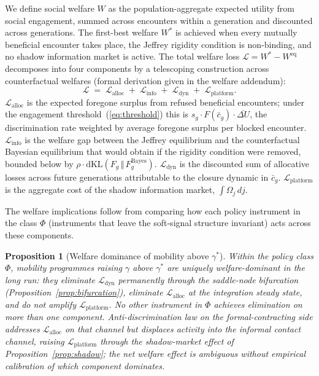 \documentclass[12pt,a4paper]{article}
\newtheorem{proposition}{Proposition}
\theoremstyle{definition}
\numberwithin{proposition}{subsection}
\begin{document}
We define social welfare $W$ as the population-aggregate expected
utility from social engagement, summed across encounters within a
generation and discounted across generations. The first-best welfare
$W^*$ is achieved when every mutually beneficial encounter takes
place, the Jeffrey rigidity condition is non-binding, and no shadow
information market is active. The total welfare loss
$\mathcal{L} = W^* - W^{\mathrm{eq}}$ decomposes into four
components by a telescoping construction across counterfactual
welfares (formal derivation given in the welfare addendum):
\begin{equation}
  \mathcal{L} \;=\;
  \mathcal{L}_{\text{alloc}} \;+\; \mathcal{L}_{\text{info}}
  \;+\; \mathcal{L}_{\text{dyn}} \;+\; \mathcal{L}_{\text{platform}}.
  \label{eq:welfare}
\end{equation}
$\mathcal{L}_{\text{alloc}}$ is the expected foregone surplus from
refused beneficial encounters; under the engagement
threshold~(\ref{eq:threshold}) this is $s_g \cdot F(\bar{c}_g)
\cdot \overline{\Delta U}$, the discrimination rate weighted by
average foregone surplus per blocked encounter.
$\mathcal{L}_{\text{info}}$ is the welfare gap between the Jeffrey
equilibrium and the counterfactual Bayesian equilibrium that would
obtain if the rigidity condition were removed, bounded below by
$\rho \cdot \mathrm{dKL}(F_g \,\Vert\, F_g^{\mathrm{Bayes}})$.
$\mathcal{L}_{\text{dyn}}$ is the discounted sum of allocative
losses across future generations attributable to the closure
dynamic in $\bar{c}_g$. $\mathcal{L}_{\text{platform}}$ is the
aggregate cost of the shadow information market,
$\int \Omega_j\, dj$.

The welfare implications follow from comparing how each policy
instrument in the class $\Phi$ (instruments that leave the
soft-signal structure invariant) acts across these components.

\begin{proposition}[Welfare dominance of mobility above $\gamma^*$]
\label{prop:dominance}
Within the policy class $\Phi$, mobility programmes raising
$\gamma$ above $\gamma^*$ are uniquely welfare-dominant in the long
run: they eliminate $\mathcal{L}_{\mathrm{dyn}}$ permanently
through the saddle-node bifurcation
(Proposition~\ref{prop:bifurcation}), eliminate
$\mathcal{L}_{\mathrm{alloc}}$ at the integration steady state, and
do not amplify $\mathcal{L}_{\mathrm{platform}}$. No other
instrument in $\Phi$ achieves elimination on more than one
component. Anti-discrimination law on the formal-contracting side
addresses $\mathcal{L}_{\mathrm{alloc}}$ on that channel but
displaces activity into the informal contact channel, raising
$\mathcal{L}_{\mathrm{platform}}$ through the shadow-market effect
of Proposition~\ref{prop:shadow}; the net welfare effect is
ambiguous without empirical calibration of which component
dominates.
\end{proposition}
\end{document}
